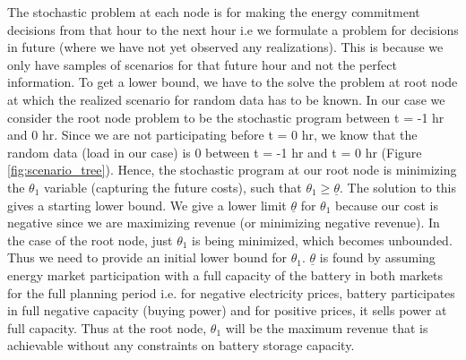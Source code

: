 \documentclass[11pt,twoside]{article}
\begin{document}
The stochastic problem at each node is for making the energy commitment decisions from that hour to the next hour i.e we formulate a problem for decisions in future (where we have not yet observed any realizations). This is because we only have samples of scenarios for that future hour and not the perfect information. To get a lower bound, we have to the solve the problem at root node at which the realized scenario for random data has to be known. In our case we consider the root node problem to be the stochastic program between t = -1 hr and 0 hr. Since we are not participating before t = 0 hr, we know that the random data (load in our case) is 0 between t = -1 hr and t = 0 hr (Figure \ref{fig:scenario_tree}). Hence, the stochastic program at our root node is minimizing the $\theta_{1}$ variable (capturing the future costs), such that $\theta_{1} \geq \underline{\theta}$. The solution to this gives a starting lower bound. We give a lower limit $\underline{\theta}$ for $\theta_1$ because our cost is negative since we are maximizing revenue (or minimizing negative revenue). In the case of the root node, just $\theta_1$ is being minimized, which becomes unbounded. Thus we need to provide an initial lower bound for $\theta_1$. $\underline{\theta}$ is found by assuming energy market participation with a full capacity of the battery in both markets for the full planning period i.e. for negative electricity prices, battery participates in full negative capacity (buying power) and for positive prices, it sells power at full capacity. Thus at the root node, $\theta_1$ will be the maximum revenue that is achievable without any constraints on battery storage capacity.   
\end{document}
